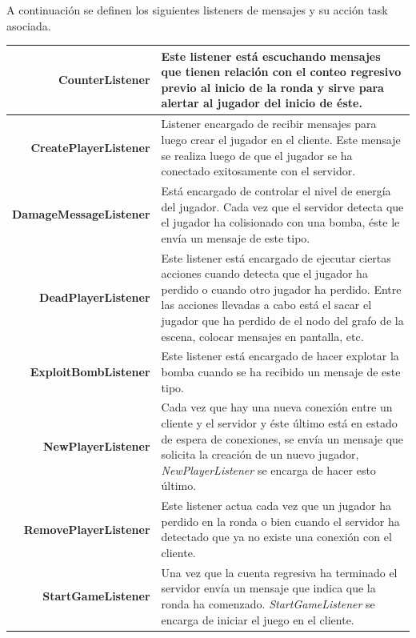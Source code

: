 \documentclass[a4paper,12pt,openany,oneside]{book}
\begin{document}
A continuación se definen los siguientes listeners de mensajes y su acción task asociada.

\begin{center}
\begin{tabular}{|r|p{10cm}|}
\hline
\textbf{CounterListener} & Este listener está escuchando mensajes que tienen relación con el conteo regresivo previo al inicio de la ronda y sirve para alertar al jugador del inicio de éste. \\	
\hline
\textbf{CreatePlayerListener} & Listener encargado de recibir mensajes para luego crear el jugador en el cliente. Este mensaje se realiza luego de que el jugador se ha conectado exitosamente con el servidor. \\	
\hline
\textbf{DamageMessageListener} & Está encargado de controlar el nivel de energía del jugador. Cada vez que el servidor detecta que el jugador ha colisionado con una bomba, éste le envía un mensaje de este tipo. \\	
\hline
\textbf{DeadPlayerListener} & Este listener está encargado de ejecutar ciertas acciones cuando detecta que el jugador ha perdido o cuando otro jugador ha perdido. Entre las acciones llevadas a cabo está el sacar el jugador que ha perdido de el nodo del grafo de la escena, colocar mensajes en pantalla, etc. \\	
\hline
\textbf{ExploitBombListener} & Este listener está encargado de hacer explotar la bomba cuando se ha recibido un mensaje de este tipo. \\	
\hline
\textbf{NewPlayerListener} & Cada vez que hay una nueva conexión entre un cliente y el servidor y éste último está en estado de espera de conexiones, se envía un mensaje que solicita la creación de un nuevo jugador, \textit{NewPlayerListener} se encarga de hacer esto último.\\	
\hline
\textbf{RemovePlayerListener} & Este listener actua cada vez que un jugador ha perdido en la ronda o bien cuando el servidor ha detectado que ya no existe una conexión con el cliente. \\	
\hline
\textbf{StartGameListener} & Una vez que la cuenta regresiva ha terminado el servidor envía un mensaje que indica que la ronda ha comenzado. \textit{StartGameListener} se encarga de iniciar el juego en el cliente. \\	
\hline
\end{tabular}
\end{center}
\end{document}
